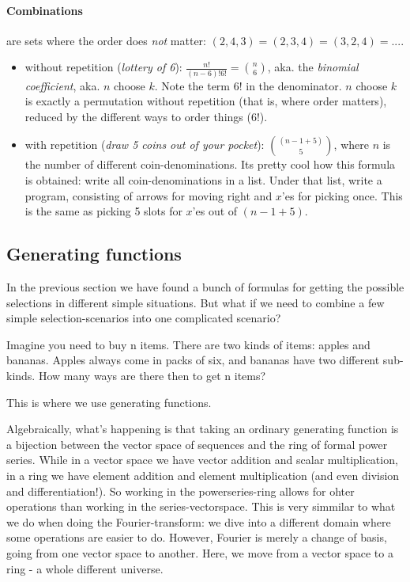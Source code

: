 \paragraph{Combinations} are sets where the order does \emph{not} matter: $(2, 4, 3) = (2, 3, 4) = (3, 2, 4) = ...$.
\begin{itemize}
    \item without repetition (\emph{lottery of 6}): $\frac{n!}{(n-6)!6!} = {n \choose 6}$, aka. the \emph{binomial coefficient}, aka. $n$ choose $k$. Note the term $6!$ in the denominator. $n$ choose $k$ is exactly a permutation without repetition (that is, where order matters), reduced by the different ways to order things ($6!$).
    \item with repetition (\emph{draw 5 coins out of your pocket}): ${(n - 1 + 5) \choose 5}$, where $n$ is the number of different coin-denominations. Its pretty cool how this formula is obtained: write all coin-denominations in a list. Under that list, write a program, consisting of arrows for moving right and $x$'es for picking once. This is the same as picking 5 slots for $x$'es out of $(n - 1 + 5)$.
\end{itemize}



\subsection{Generating functions}

In the previous section we have found a bunch of formulas for getting the possible selections in different simple situations. But what if we need to combine a few simple selection-scenarios into one complicated scenario? 

Imagine you need to buy n items. There are two kinds of items: apples and bananas. Apples always come in packs of six, and bananas have two different sub-kinds. How many ways are there then to get n items?

This is where we use generating functions. 


Algebraically, what's happening is that taking an ordinary generating function is a bijection between the vector space of sequences and the ring of formal power series. While in a vector space we have vector addition and scalar multiplication, in a ring we have element addition and element multiplication (and even division and differentiation!). So working in the powerseries-ring allows for ohter operations than working in the series-vectorspace. This is very simmilar to what we do when doing the Fourier-transform: we dive into a different domain where some operations are easier to do. However, Fourier is merely a change of basis, going from one vector space to another. Here, we move from a vector space to a ring - a whole different universe. 



